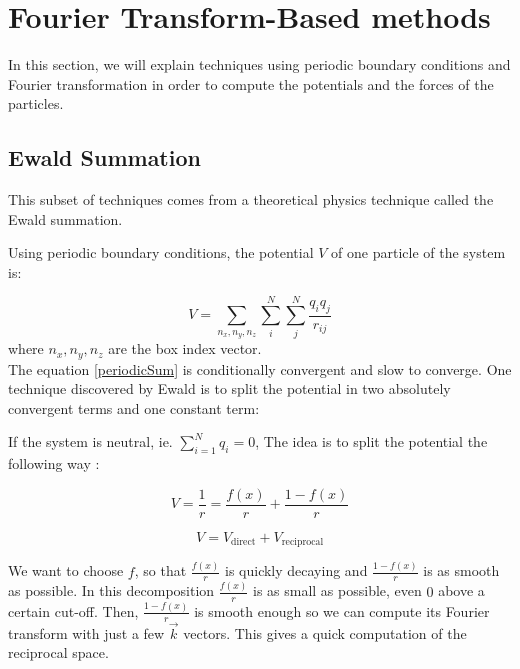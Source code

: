 \documentclass[12pt,twoside,a4paper]{report}
\begin{document}


\section{Fourier Transform-Based methods}

In this section, we will explain techniques using periodic boundary conditions and Fourier transformation in order to compute the potentials and the forces of the particles.

\subsection{Ewald Summation}

This subset of techniques comes from a theoretical physics technique called the Ewald summation.

Using periodic boundary conditions, the potential $V$ of one particle of the system is:

\begin{equation}
	V = \sum_{n_x,n_y,n_z} \sum_{i}^{N} \sum_{j}^{N} \frac{q_i q_j}{r_{ij}}
	\label{periodicSum}
\end{equation}
where $n_x,n_y,n_z$ are the box index vector.\\

The equation \ref{periodicSum} is conditionally convergent and slow to converge. One technique discovered by Ewald is to split the potential in two absolutely convergent terms and one constant term:


If the system is neutral, ie. $\sum_{i=1}^N q_i = 0$, The idea is to split the potential the following way :

\begin{equation}
    V = \frac{1}{r} = \frac{f(x)}{r} + \frac{1 - f(x)}{r}
\end{equation}


\begin{equation}
    V = V_{\text{direct}} + V_{\text{reciprocal}}
\end{equation}

We want to choose $f$, so that $\frac{f(x)}{r}$ is quickly decaying and $\frac{1 - f(x)}{r}$ is as smooth as possible. In this decomposition $\frac{f(x)}{r}$  is as small as possible, even $0$ above a certain cut-off. Then, $\frac{1-f(x)}{r}$ is smooth enough so we can compute its Fourier transform with just a few $\overrightarrow{k}$ vectors. This gives a quick computation of the reciprocal space.
\end{document}
